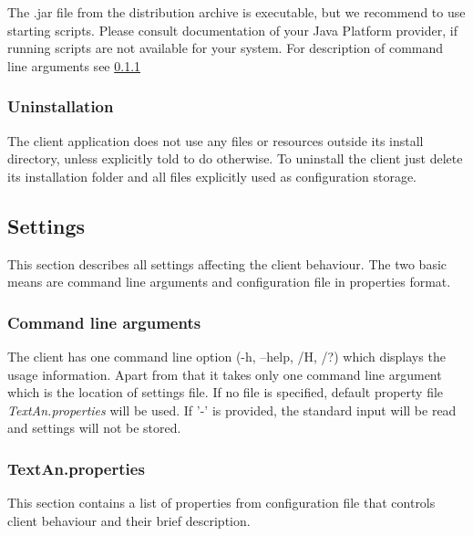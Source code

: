 \documentclass[12pt,a4paper]{report}
\begin{document}
The .jar file from the distribution archive is executable,
but we recommend to use starting scripts.
Please consult documentation of your Java Platform provider,
if running scripts are not available for your system.
For description of command line arguments see \ref{ssec:CliCmdArg}

\subsubsection{Uninstallation}

The client application does not use any files or resources outside its install directory,
unless explicitly told to do otherwise.
To uninstall the client just delete its installation folder
and all files explicitly used as configuration storage.

\subsection{Settings}

This section describes all settings affecting the client behaviour.
The two basic means are command line arguments and configuration file in properties format.

\subsubsection{Command line arguments}
\label{ssec:CliCmdArg}

The client has one command line option (-h, --help, /H, /?) which displays the usage information.
Apart from that it takes only one command line argument which is the location of settings file.
If no file is specified, default property file \emph{TextAn.properties} will be used.
If '-' is provided, the standard input will be read and settings will not be stored.

\subsubsection{TextAn.properties}

This section contains a list of properties from configuration file that controls
client behaviour and their brief description.
\end{document}
